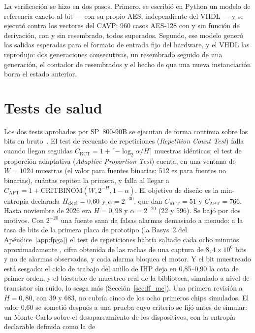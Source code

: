 La verificación se hizo en dos pasos. Primero, se escribió en Python un
modelo de referencia exacto al bit --- con su propio AES, independiente
del VHDL --- y se ejecutó contra los vectores del CAVP: 960 casos AES-128
con y sin función de derivación, con y sin resembrado, todos superados.
Segundo, ese modelo generó las salidas esperadas para el formato de
entrada fijo del hardware, y el VHDL las reprodujo: dos generaciones
consecutivas, un resembrado seguido de una generación, el contador de
resembrados y el hecho de que una nueva instanciación borra el estado
anterior.

\section{Tests de salud}
\label{sec:health}

Los dos tests aprobados por SP~800-90B se ejecutan de forma continua
sobre los bits en bruto~\cite{turan_2018_sp80090b}. El test de recuento
de repeticiones (\emph{Repetition Count Test}) falla cuando llegan
seguidas $C_{\mathrm{RCT}} = 1 + \lceil -\log_2\alpha / H \rceil$
muestras idénticas; el test de proporción adaptativa (\emph{Adaptive
Proportion Test}) cuenta, en una ventana de $W = 1024$ muestras (el valor
para fuentes binarias; 512 es para fuentes no binarias), cuántas repiten
la primera, y falla al llegar a
$C_{\mathrm{APT}} = 1 + \mathrm{CRITBINOM}(W, 2^{-H}, 1-\alpha)$. El
objetivo de diseño es la min-entropía declarada $H_{\mathrm{decl}} = 0{,}60$ y
$\alpha = 2^{-30}$, que dan
$C_{\mathrm{RCT}} = 51$ y $C_{\mathrm{APT}} = 766$. Hasta noviembre de 2026
era $H = 0{,}98$ y $\alpha = 2^{-20}$ (22 y 596). Se bajó por dos motivos.
Con $2^{-20}$ una fuente sana da falsas alarmas demasiado a menudo: a la
tasa de bits de la primera placa de prototipo (la Basys~2 del
Apéndice~\ref{app:fpga}) el test de repeticiones habría saltado cada
ocho minutos aproximadamente \est{}, cifra obtenida de las rachas de una
captura de $8{,}4\times10^6$ bits y no de alarmas observadas, y cada
alarma bloquea el motor. Y el bit
muestreado está sesgado: el ciclo de trabajo del anillo de IHP deja en
0,85--0,90 la cota de primer orden, y el biestable de muestreo real de la
biblioteca, simulado a nivel de transistor sin ruido, lo sesga más
(Sección~\ref{sec:ff_mc}). Una primera revisión a
$H = 0{,}80$, con 39 y 683, no cubría cinco de los ocho primeros chips
simulados. El valor 0,60 se sometió después a una prueba cuyo criterio
se fijó antes de simular: un Monte Carlo sobre el desapareamiento de los
dispositivos, con la entropía declarable definida como la de
